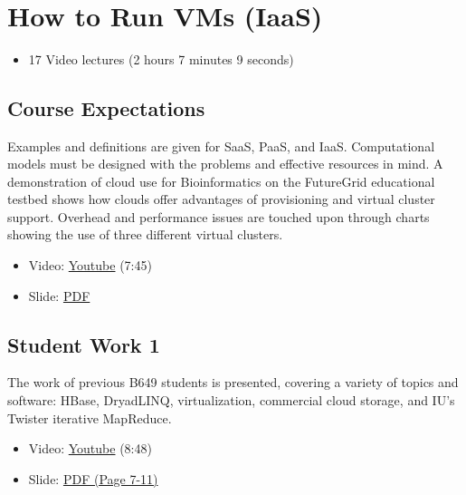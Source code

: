 \FILENAME\

\chapter{How to Run VMs (IaaS)}\label{how-to-run-vms-iaas}

\begin{itemize}

\item
  17 Video lectures (2 hours 7 minutes 9 seconds)
\end{itemize}

\section{Course Expectations}\label{course-expectations}

Examples and definitions are given for SaaS, PaaS, and IaaS.
Computational models must be designed with the problems and effective
resources in mind. A demonstration of cloud use for Bioinformatics on
the FutureGrid educational testbed shows how clouds offer advantages of
provisioning and virtual cluster support. Overhead and performance
issues are touched upon through charts showing the use of three
different virtual clusters.

\begin{itemize}

\item
  Video: \href{https://www.youtube.com/watch?v=j3sUW376pw8}{Youtube}
  (7:45)
\end{itemize}

\begin{itemize}

\item
  Slide:
  \href{https://drive.google.com/open?id=0B88HKpainTSfQU1uQmxZWHdWQ1k}{PDF}
\end{itemize}

\section{Student Work 1}\label{student-work-1}

The work of previous B649 students is presented, covering a variety of
topics and software: HBase, DryadLINQ, virtualization, commercial cloud
storage, and IU's Twister iterative MapReduce.

\begin{itemize}

\item
  Video: \href{https://www.youtube.com/watch?v=DYG6_bUGsqY}{Youtube}
  (8:48)
\item
  Slide:
  \href{https://drive.google.com/open?id=0B88HKpainTSfQU1uQmxZWHdWQ1k}{PDF
  (Page 7-11)}
\end{itemize}

